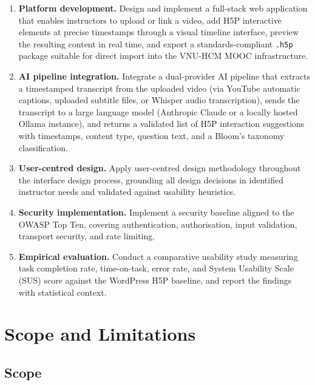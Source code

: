 \begin{enumerate}
  \item \textbf{Platform development.} Design and implement a full-stack
  web application that enables instructors to upload or link a video, add
  H5P interactive elements at precise timestamps through a visual timeline
  interface, preview the resulting content in real time, and export a
  standards-compliant \texttt{.h5p} package suitable for direct import into
  the VNU-HCM MOOC infrastructure.

  \item \textbf{AI pipeline integration.} Integrate a dual-provider AI
  pipeline that extracts a timestamped transcript from the uploaded video
  (via YouTube automatic captions, uploaded subtitle files, or Whisper audio
  transcription), sends the transcript to a large language model (Anthropic
  Claude or a locally hosted Ollama instance), and returns a validated list
  of H5P interaction suggestions with timestamps, content type, question
  text, and a Bloom's taxonomy classification.

  \item \textbf{User-centred design.} Apply user-centred design methodology
  throughout the interface design process, grounding all design decisions in
  identified instructor needs and validated against usability heuristics.

  \item \textbf{Security implementation.} Implement a security baseline
  aligned to the OWASP Top Ten, covering authentication, authorisation,
  input validation, transport security, and rate limiting.

  \item \textbf{Empirical evaluation.} Conduct a comparative usability study
  measuring task completion rate, time-on-task, error rate, and System
  Usability Scale (SUS) score against the WordPress H5P baseline, and report
  the findings with statistical context.
\end{enumerate}

\section{Scope and Limitations}

\subsection{Scope}

